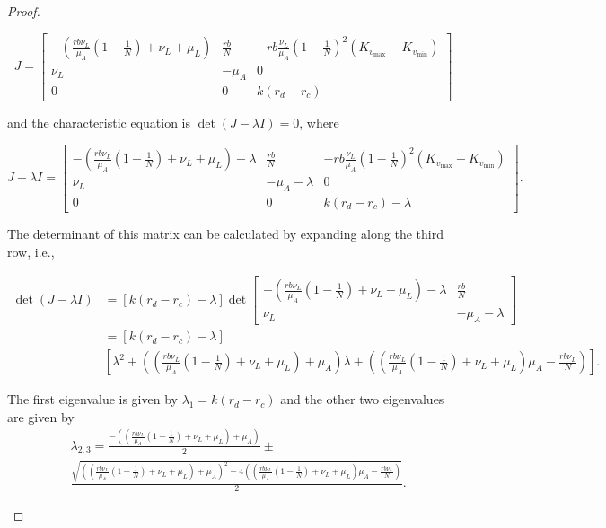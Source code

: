 \documentclass{article}
\theoremstyle{remark}
\theoremstyle{custom} %
\begin{document}
\begin{proof}
\begin{itemize}
\[
J = \begin{bmatrix}
-\left(\frac{r b \nu_L}{\mu_A} \left(1 - \frac{1}{{N}}\right) + \nu_L + \mu_L\right) & \frac{r b}{{N}} & -r b \frac{\nu_L}{\mu_A} \left(1 - \frac{1}{{N}}\right)^2 \left(K_{v_{\max}} - K_{v_{\min}}\right) \\
\nu_L & -\mu_A & 0 \\
0 & 0 & k(r_d - r_c)
\end{bmatrix}
\]

and the characteristic equation is  \(\det(J - \lambda I) = 0\), where


\[
J - \lambda I = \begin{bmatrix}
-\left(\frac{r b \nu_L}{\mu_A} \left(1 - \frac{1}{{N}}\right) + \nu_L + \mu_L\right) - \lambda & \frac{r b}{{N}} & -r b \frac{\nu_L}{\mu_A} \left(1 - \frac{1}{{N}}\right)^2 \left(K_{v_{\max}} - K_{v_{\min}}\right) \\
\nu_L & -\mu_A - \lambda & 0 \\
0 & 0 & k(r_d - r_c) - \lambda
\end{bmatrix}.
\]

The determinant of this matrix can be calculated by expanding along the third row, i.e.,

$$
\begin{aligned}
\operatorname{det}(J-\lambda I)&=[k(r_d - r_c)-\lambda] \operatorname{det}\left[\begin{array}{cc}
-\left(\frac{r b \nu_L}{\mu_A}\left(1-\frac{1}{{N}}\right)+\nu_L+\mu_L\right)-\lambda & \frac{r b}{{N}} \\
\nu_L & -\mu_A-\lambda
\end{array}\right] \\
& =[k(r_d - r_c)-\lambda] \\
& {\left[\lambda^2+\left(\left(\frac{r b \nu_L}{\mu_A}\left(1-\frac{1}{{N}}\right)+\nu_L+\mu_L\right)+\mu_A\right) \lambda+\left(\left(\frac{r b \nu_L}{\mu_A}\left(1-\frac{1}{{N}}\right)+\nu_L+\mu_L\right) \mu_A-\frac{r b \nu_L}{{N}}\right)\right]}.
\end{aligned}
$$

The first eigenvalue is given by \(\lambda_1 = k(r_d - r_c)\) and the other two eigenvalues are given by $$
\begin{aligned}
& \lambda_{2,3}=\frac{-\left(\left(\frac{r b \nu_L}{\mu_A}\left(1-\frac{1}{{N}}\right)+\nu_L+\mu_L\right)+\mu_A\right)}{2} \pm \\
& \frac{\sqrt{\left(\left(\frac{r b \nu_L}{\mu_A}\left(1-\frac{1}{{N}}\right)+\nu_L+\mu_L\right)+\mu_A\right)^2-4\left(\left(\frac{r b \nu_L}{\mu_A}\left(1-\frac{1}{{N}}\right)+\nu_L+\mu_L\right) \mu_A-\frac{r b \nu_L}{{N}}\right)}}{2}.
\end{aligned}
$$




\end{itemize}
\end{proof}
\end{document}
